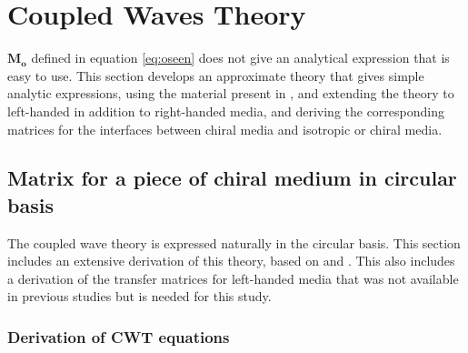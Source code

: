 \section{Coupled Waves Theory}
\label{sec:cwt}
$\bm{M_o}$ defined in equation \ref{eq:oseen} does not give an analytical expression that is easy to use. This section develops an approximate theory that gives simple analytic expressions, using the material present in \cite{mccall_properties_2009}, and extending the theory to left-handed in addition to right-handed media, and deriving the corresponding matrices for the interfaces between chiral media and isotropic or chiral media.
\subsection{Matrix for a piece of chiral medium in circular basis}
The coupled wave theory is expressed naturally in the circular basis. This section includes an extensive derivation of this theory, based on \cite{mccall_photonics_2020} and \cite{mccall_simplified_2009}. This also includes a derivation of the transfer matrices for left-handed media that was not available in previous studies\cite{mccall_simplified_2009}\cite{mccall_properties_2009} but is needed for this study.

\subsubsection{Derivation of CWT equations}


